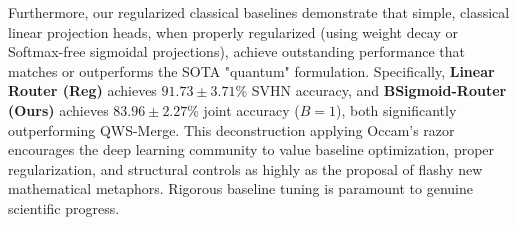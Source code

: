 Furthermore, our regularized classical baselines demonstrate that simple, classical linear projection heads, when properly regularized (using weight decay or Softmax-free sigmoidal projections), achieve outstanding performance that matches or outperforms the SOTA "quantum" formulation. Specifically, \textbf{Linear Router (Reg)} achieves $91.73 \pm 3.71$\% SVHN accuracy, and \textbf{BSigmoid-Router (Ours)} achieves $83.96 \pm 2.27$\% joint accuracy ($B=1$), both significantly outperforming QWS-Merge. This deconstruction applying Occam's razor encourages the deep learning community to value baseline optimization, proper regularization, and structural controls as highly as the proposal of flashy new mathematical metaphors. Rigorous baseline tuning is paramount to genuine scientific progress.
